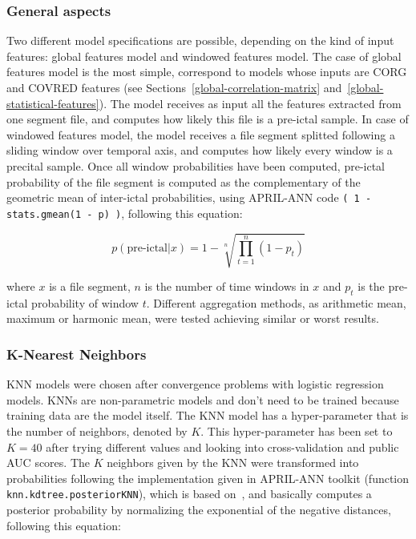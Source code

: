 \documentclass[a4paper,english,twoside]{article}
\begin{document}
\subsubsection{General aspects}

Two different model specifications are possible, depending on the kind of input
features: global features model and windowed features model. The case of global
features model is the most simple, correspond to models whose inputs are CORG
and COVRED features (see Sections~\ref{global-correlation-matrix}
and~\ref{global-statistical-features}). The model receives as input all the
features extracted from one segment file, and computes how likely this file is a
pre-ictal sample. In case of windowed features model, the model receives a file
segment splitted following a sliding window over temporal axis, and computes how
likely every window is a precital sample. Once all window probabilities have
been computed, pre-ictal probability of the file segment is computed as the
complementary of the geometric mean of inter-ictal probabilities, using
APRIL-ANN code \verb+( 1 -stats.gmean(1 - p) )+, following this equation:

\begin{equation}
p(\text{pre-ictal} | x) = 1 - \sqrt[n]{\prod_{t=1}^n (1 - p_t)}
\label{eq:gmean}
\end{equation}

\noindent where $x$ is a file segment, $n$ is the number of time windows in $x$
and $p_t$ is the pre-ictal probability of window $t$. Different aggregation
methods, as arithmetic mean, maximum or harmonic mean, were tested achieving
similar or worst results.

\subsubsection{K-Nearest Neighbors}\label{k-nearest-neighbors}

KNN models were chosen after convergence problems with logistic regression
models. KNNs are non-parametric models and don't need to be trained because
training data are the model itself. The KNN model has a hyper-parameter that is
the number of neighbors, denoted by $K$. This hyper-parameter has been set to
$K=40$ after trying different values and looking into cross-validation and
public AUC scores. The $K$ neighbors given by the KNN were transformed into
probabilities following the implementation given in APRIL-ANN toolkit (function
\verb+knn.kdtree.posteriorKNN+), which is based on~\cite{2005:nips:hinton:NCA},
and basically computes a posterior probability by normalizing the exponential of
the negative distances, following this equation:
\end{document}
